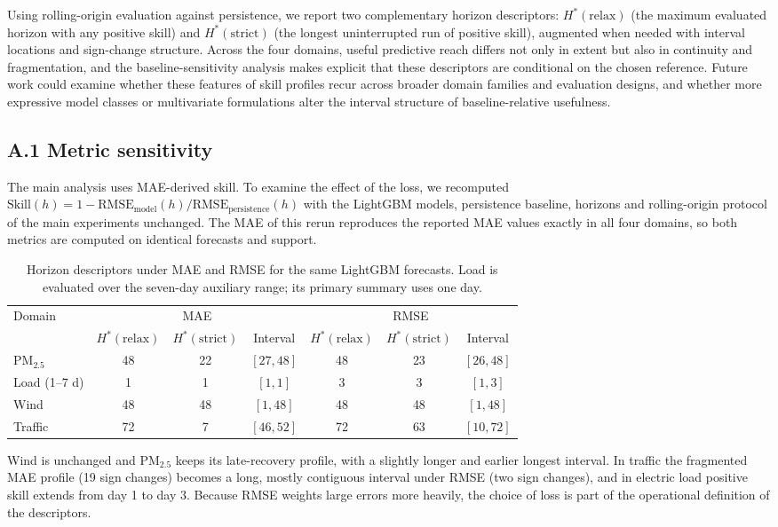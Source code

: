 \documentclass[pdflatex]{sn-jnl}
\begin{document}
Using rolling-origin evaluation against persistence, we report two
complementary horizon descriptors: $H^*(\mathrm{relax})$ (the maximum
evaluated horizon with any positive skill) and $H^*(\mathrm{strict})$
(the longest uninterrupted run of positive skill), augmented when needed
with interval locations and sign-change structure. Across the four
domains, useful predictive reach differs not only in extent but also in
continuity and fragmentation, and the baseline-sensitivity analysis makes
explicit that these descriptors are conditional on the chosen reference.
Future work could examine whether these
features of skill profiles recur across broader
domain families and evaluation designs, and whether more expressive model
classes or multivariate formulations alter the interval structure of
baseline-relative usefulness.

\appendix

\subsection*{A.1 Metric sensitivity}

The main analysis uses MAE-derived skill. To examine the effect of the loss,
we recomputed $\mathrm{Skill}(h)=1-\mathrm{RMSE}_{\mathrm{model}}(h)/\mathrm{RMSE}_{\mathrm{persistence}}(h)$
with the LightGBM models, persistence baseline, horizons and rolling-origin
protocol of the main experiments unchanged. The MAE of this rerun reproduces
the reported MAE values exactly in all four domains, so both metrics are
computed on identical forecasts and support.
\begin{table}[h]
\centering
\small
\begin{tabular}{@{}lcccccc@{}}
\toprule
Domain & \multicolumn{3}{c}{MAE} & \multicolumn{3}{c}{RMSE} \\
\cmidrule(lr){2-4}\cmidrule(lr){5-7}
 & $H^*(\mathrm{relax})$ & $H^*(\mathrm{strict})$ & Interval & $H^*(\mathrm{relax})$ & $H^*(\mathrm{strict})$ & Interval \\
\midrule
PM$_{2.5}$ & 48 & 22 & $[27,48]$ & 48 & 23 & $[26,48]$ \\
Load (1--7 d) & 1 & 1 & $[1,1]$ & 3 & 3 & $[1,3]$ \\
Wind & 48 & 48 & $[1,48]$ & 48 & 48 & $[1,48]$ \\
Traffic & 72 & 7 & $[46,52]$ & 72 & 63 & $[10,72]$ \\
\bottomrule
\end{tabular}
\caption{Horizon descriptors under MAE and RMSE for the same LightGBM forecasts.
Load is evaluated over the seven-day auxiliary range; its primary summary uses one day.}
\label{tab:metric-sensitivity}
\end{table}
Wind is unchanged and PM$_{2.5}$ keeps its late-recovery profile, with a slightly
longer and earlier longest interval. In traffic the fragmented MAE profile
(19 sign changes) becomes a long, mostly contiguous interval under RMSE (two sign
changes), and in electric load positive skill extends from day 1 to day 3.
Because RMSE weights large errors more heavily, the choice of loss is part of the
operational definition of the descriptors.
\end{document}
